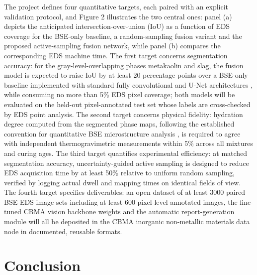 \documentclass[11pt,a4paper]{article}
\begin{document}
The project defines four quantitative targets, each paired with an explicit validation protocol, and Figure 2 illustrates the two central ones: panel (a) depicts the anticipated intersection-over-union (IoU) as a function of EDS coverage for the BSE-only baseline, a random-sampling fusion variant and the proposed active-sampling fusion network, while panel (b) compares the corresponding EDS machine time. The first target concerns segmentation accuracy: for the gray-level-overlapping phases metakaolin and slag, the fusion model is expected to raise IoU by at least 20 percentage points over a BSE-only baseline implemented with standard fully convolutional and U-Net architectures \citep{long2015,ronneberger2015}, while consuming no more than 5\% EDS pixel coverage; both models will be evaluated on the held-out pixel-annotated test set whose labels are cross-checked by EDS point analysis. The second target concerns physical fidelity: hydration degree computed from the segmented phase maps, following the established convention for quantitative BSE microstructure analysis \citep{scrivener2004}, is required to agree with independent thermogravimetric measurements within 5\% across all mixtures and curing ages. The third target quantifies experimental efficiency: at matched segmentation accuracy, uncertainty-guided active sampling is designed to reduce EDS acquisition time by at least 50\% relative to uniform random sampling, verified by logging actual dwell and mapping times on identical fields of view. The fourth target specifies deliverables: an open dataset of at least 3000 paired BSE-EDS image sets including at least 600 pixel-level annotated images, the fine-tuned CBMA vision backbone weights and the automatic report-generation module will all be deposited in the CBMA inorganic non-metallic materials data node in documented, reusable formats.

\section{Conclusion}
\end{document}
